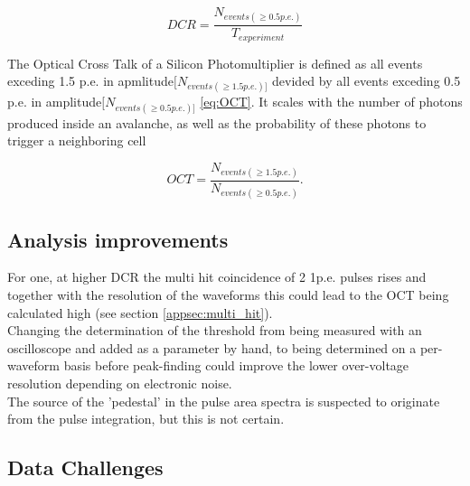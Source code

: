 \documentclass[12pt,article,type=msc,colorback,accentcolor=tud9c]{tudthesis}
\begin{document}
\begin{equation}\label{eq:DCR_eq}
DCR = \frac{N_{events(\geq 0.5p.e.)}}{T_{experiment}}
\end{equation}


The Optical Cross Talk of a Silicon Photomultiplier is defined as all events exceding 1.5 p.e. in apmlitude$[N_{events(\geq 1.5p.e.)]}$ devided by all events exceding 0.5 p.e. in amplitude$[N_{events(\geq 0.5p.e.)]}$ \ref{eq:OCT}. It scales with the number of photons produced inside an avalanche, as well as the probability of these photons to trigger a neighboring cell

\begin{equation}\label{eq:OCT}
OCT = \frac{N_{events(\geq 1.5p.e.)}}{N_{events(\geq 0.5p.e.)}}.
\end{equation}

\subsection{Analysis improvements}
For one, at higher DCR the multi hit coincidence of 2 1p.e. pulses rises and together with the resolution of the waveforms this could lead to the OCT being calculated high (see section \ref{appsec:multi_hit}).\\ Changing the determination of the threshold from being measured with an oscilloscope and added as a parameter by hand, to being determined on a per-waveform basis before peak-finding could improve the lower over-voltage resolution depending on electronic noise.\\ The source of the 'pedestal' in the pulse area spectra is suspected to originate from the pulse integration, but this is not certain.


\newpage
\subsection{Data Challenges}
\label{subsec:data_challenges}
\end{document}
